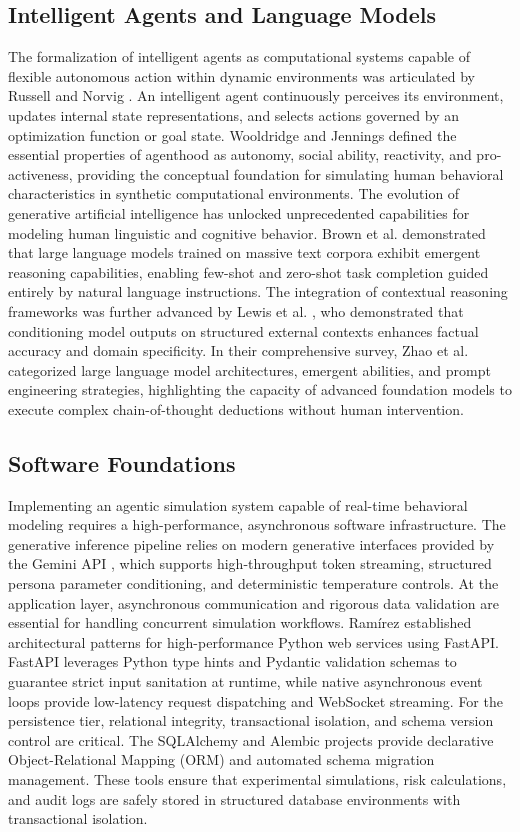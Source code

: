 \documentclass[conference,letterpaper]{IEEEtran}
\begin{document}
\subsection{Intelligent Agents and Language Models}
The formalization of intelligent agents as computational systems capable of flexible autonomous action within dynamic environments was articulated by Russell and Norvig \cite{russell2021}. An intelligent agent continuously perceives its environment, updates internal state representations, and selects actions governed by an optimization function or goal state. Wooldridge and Jennings \cite{wooldridge1995} defined the essential properties of agenthood as autonomy, social ability, reactivity, and pro-activeness, providing the conceptual foundation for simulating human behavioral characteristics in synthetic computational environments. The evolution of generative artificial intelligence has unlocked unprecedented capabilities for modeling human linguistic and cognitive behavior. Brown et al. \cite{brown2020} demonstrated that large language models trained on massive text corpora exhibit emergent reasoning capabilities, enabling few-shot and zero-shot task completion guided entirely by natural language instructions. The integration of contextual reasoning frameworks was further advanced by Lewis et al. \cite{lewis2020}, who demonstrated that conditioning model outputs on structured external contexts enhances factual accuracy and domain specificity. In their comprehensive survey, Zhao et al. \cite{zhao2023} categorized large language model architectures, emergent abilities, and prompt engineering strategies, highlighting the capacity of advanced foundation models to execute complex chain-of-thought deductions without human intervention.

\subsection{Software Foundations}
Implementing an agentic simulation system capable of real-time behavioral modeling requires a high-performance, asynchronous software infrastructure. The generative inference pipeline relies on modern generative interfaces provided by the Gemini API \cite{gemini2024}, which supports high-throughput token streaming, structured persona parameter conditioning, and deterministic temperature controls. At the application layer, asynchronous communication and rigorous data validation are essential for handling concurrent simulation workflows. Ram\'irez \cite{fastapi2024} established architectural patterns for high-performance Python web services using FastAPI. FastAPI leverages Python type hints and Pydantic validation schemas to guarantee strict input sanitation at runtime, while native asynchronous event loops provide low-latency request dispatching and WebSocket streaming. For the persistence tier, relational integrity, transactional isolation, and schema version control are critical. The SQLAlchemy and Alembic projects \cite{sqlalchemy2024} provide declarative Object-Relational Mapping (ORM) and automated schema migration management. These tools ensure that experimental simulations, risk calculations, and audit logs are safely stored in structured database environments with transactional isolation.
\end{document}
